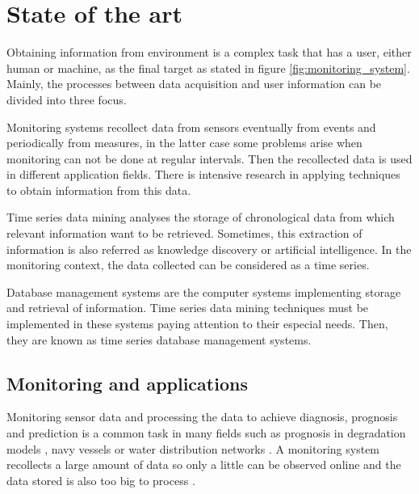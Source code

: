 
\section{State of the art}

Obtaining information from environment is a complex task that has a user, either human or machine, as the final target as stated in figure \ref{fig:monitoring_system}. Mainly, the processes between data acquisition and user information can be divided into three focus.


Monitoring systems recollect data from sensors eventually from events and periodically from measures, in the latter case some problems arise when monitoring can not be done at regular intervals. Then the recollected data is used in different application fields. There is intensive research in applying techniques to obtain information from this data.

Time series data mining analyses the storage of chronological data from which relevant information want to be retrieved. Sometimes, this extraction of information is also referred as knowledge discovery or artificial intelligence.
In the monitoring context, the data collected can be considered as a time series.

Database management systems are the computer systems implementing storage and retrieval of information. Time series data mining techniques must be implemented in these systems paying attention to their especial needs. Then, they are known as time series database management systems.



\subsection{Monitoring and applications}

Monitoring sensor data and processing the data to achieve diagnosis,
prognosis and prediction is a common task in many fields such as
prognosis in degradation models \parencite{yu11}, navy
vessels \parencite{palmer07} or water distribution
networks \parencite{quevedo10}.  A monitoring system recollects a
large amount of data so only a little can be observed online and the
data stored is also too big to process \parencite{keogh97}.

